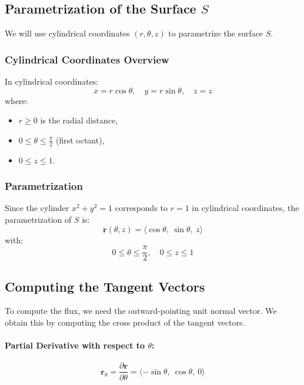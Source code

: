\documentclass[11pt]{article}
\begin{document}
\newpage

\subsection{Parametrization of the Surface \( S \)}

We will use cylindrical coordinates \((r, \theta, z)\) to parametrize the surface \( S \).

\subsubsection*{Cylindrical Coordinates Overview}

In cylindrical coordinates:
\[
x = r \cos\theta, \quad y = r \sin\theta, \quad z = z
\]
where:
\begin{itemize}
    \item \( r \geq 0 \) is the radial distance,
    \item \( 0 \leq \theta \leq \frac{\pi}{2} \) (first octant),
    \item \( 0 \leq z \leq 1 \).
\end{itemize}

\subsubsection*{Parametrization}

Since the cylinder \( x^2 + y^2 = 1 \) corresponds to \( r = 1 \) in cylindrical coordinates, the parametrization of \( S \) is:
\[
\mathbf{r}(\theta, z) = \langle \cos\theta, \ \sin\theta, \ z \rangle
\]
with:
\[
0 \leq \theta \leq \frac{\pi}{2}, \quad 0 \leq z \leq 1
\]

\newpage

\subsection{Computing the Tangent Vectors}

To compute the flux, we need the outward-pointing unit normal vector. We obtain this by computing the cross product of the tangent vectors.

\paragraph{Partial Derivative with respect to \( \theta \):}
\[
\mathbf{r}_\theta = \frac{\partial \mathbf{r}}{\partial \theta} = \langle -\sin\theta, \ \cos\theta, \ 0 \rangle
\]
\end{document}
